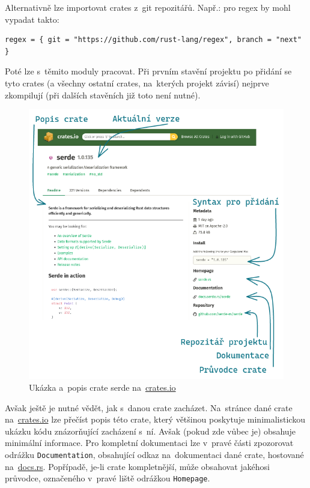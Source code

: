 \documentclass[a4paper, 12pt, twoside]{article} %
\begin{document}
			Alternativně lze importovat crates z~git repozitářů. Např.: pro regex by mohl vypadat takto:
			\begin{verbatim}
regex = { git = "https://github.com/rust-lang/regex", branch = "next" }
			\end{verbatim}

			Poté lze s~těmito moduly pracovat. Při prvním stavění projektu po přidání se tyto crates (a všechny ostatní crates, na~kterých projekt závisí) nejprve zkompilují (při dalších stavěních již toto není nutné).
			
			\begin{center}
				\begin{figure}[H]
					\centering
					\includegraphics[width=0.95\linewidth]{cratesio}
					\caption{Ukázka a~popis crate serde na~\href{https://crates.io}{crates.io}}
					\label{fig:cratesio}
				\end{figure}
			\end{center}
			
			Avšak ještě je nutné vědět, jak s~danou crate zacházet. Na~stránce dané crate na~\href{https://crates.io}{crates.io} lze přečíst popis této crate, který většinou poskytuje minimalistickou ukázku kódu znázorňující zacházení s~ní. Avšak (pokud zde vůbec je) obsahuje minimální informace. Pro kompletní dokumentaci lze v~pravé části zpozorovat odrážku \texttt{Documentation}, obsahující odkaz na~dokumentaci dané crate, hostované na~\href{https://docs.rs/}{docs.rs}. Popřípadě, je-li crate kompletnější, může obsahovat jakéhosi průvodce, označeného v~pravé liště odrážkou \texttt{Homepage}.
\end{document}
